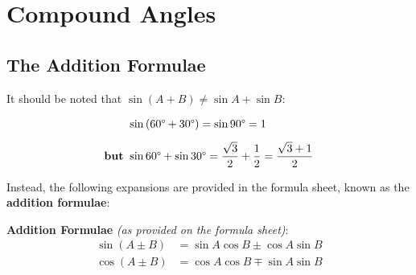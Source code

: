 \documentclass[
  11pt,
  openany]{book}
\begin{document}
\chapterfont{\color{white}}

\chapter{Compound Angles}\label{compound-angles}

\vspace{-12cm}
\begin{center}
\end{center}

\section{The Addition Formulae}\label{the-addition-formulae}

\vspace{-0.5cm}

It should be noted that \(\sin{(A+B)}\ne \sin{A}+\sin{B}\):

\vspace{-0.3cm}

\begin{align*}
    &\sin{(60\degree+30\degree)}=\sin{90\degree}=1\\[0.5em]
    \textbf{but }&\sin{60\degree}+\sin{30\degree}=\frac{\sqrt{3}}{2}+\frac{1}{2}=\frac{\sqrt{3}+1}{2}
\end{align*}

\vspace{-0.3cm}

Instead, the following expansions are provided in the formula sheet, known as the \textbf{addition formulae}:

\vspace{-0.3cm}

\begin{center}
\begin{tcolorbox}[colback=red!5,colframe=red!70!black]
\centering
\textbf{Addition Formulae} \textit{(as provided on the formula sheet)}:
\begin{align*}
    \sin{(A\pm B)}&=\sin{A}\cos{B}\pm\cos{A}\sin{B}\\[1em]
    \cos{(A\pm B)}&=\cos{A}\cos{B}\mp\sin{A}\sin{B}
\end{align*}

\end{tcolorbox}
\end{center}
\end{document}
